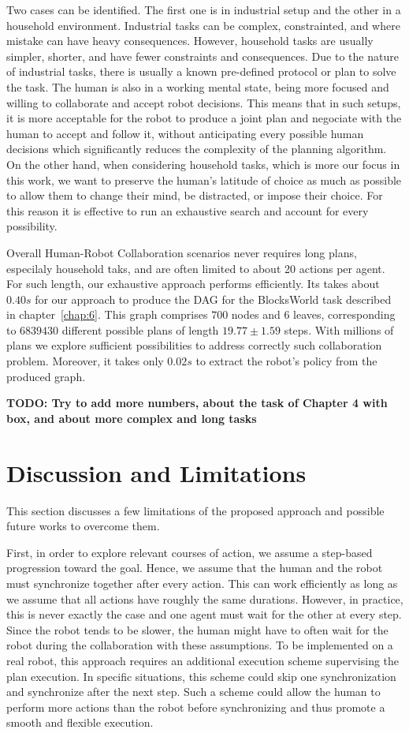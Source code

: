 Two cases can be identified. The first one is in industrial setup and the other in a household environment. Industrial tasks can be complex, constrainted, and where mistake can have heavy consequences. However, household tasks are usually simpler, shorter, and have fewer constraints and consequences. Due to the nature of industrial tasks, there is usually a known pre-defined protocol or plan to solve the task. The human is also in a working mental state, being more focused and willing to collaborate and accept robot decisions. This means that in such setups, it is more acceptable for the robot to produce a joint plan and negociate with the human to accept and follow it, without anticipating every possible human decisions which significantly reduces the complexity of the planning algorithm.
On the other hand, when considering household tasks, which is more our focus in this work, we want to preserve the human's latitude of choice as much as possible to allow them to change their mind, be distracted, or impose their choice. For this reason it is effective to run an exhaustive search and account for every possibility. 

Overall Human-Robot Collaboration scenarios never requires long plans, especilaly household taks, and are often limited to about 20 actions per agent. For such length, our exhaustive approach performs efficiently. Its takes about $0.40s$ for our approach to produce the DAG for the BlocksWorld task described in chapter~\ref{chap:6}. This graph comprises $700$ nodes and $6$ leaves, corresponding to $6839430$ different possible plans of length $19.77 \pm 1.59$ steps. With millions of plans we explore sufficient possibilities to address correctly such collaboration problem. Moreover, it takes only $0.02s$ to extract the robot's policy from the produced graph. 

\textbf{TODO: Try to add more numbers, about the task of Chapter 4 with box, and about more complex and long tasks}


\section{Discussion and Limitations}


This section discusses a few limitations of the proposed approach and possible future works to overcome them. 

First, in order to explore relevant courses of action, we assume a step-based progression toward the goal. Hence, we assume that the human and the robot must synchronize together after every action. This can work efficiently as long as we assume that all actions have roughly the same durations. However, in practice, this is never exactly the case and one agent must wait for the other at every step. Since the robot tends to be slower, the human might have to often wait for the robot during the collaboration with these assumptions. To be implemented on a real robot, this approach requires an additional execution scheme supervising the plan execution. In specific situations, this scheme could skip one synchronization and synchronize after the next step. Such a scheme could allow the human to perform more actions than the robot before synchronizing and thus promote a smooth and flexible execution.

